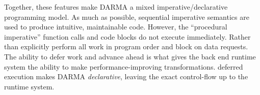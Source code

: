 Together, these features make \gls{DARMA} a mixed \gls{imperative}/\gls{declarative} \gls{programming model}.
As much as possible, sequential imperative semantics are used to produce intuitive, maintainable code.
However, the ``procedural imperative'' function calls and code blocks do not execute immediately.
Rather than explicitly perform all work in program order and block on data requests.
The ability to defer work and advance ahead is what gives the \gls{back end}
\gls{runtime  system} the ability to make performance-improving transformations.
\Gls{deferred execution} makes \gls{DARMA} \emph{declarative}, leaving the
exact control-flow up to the \gls{runtime system}.








